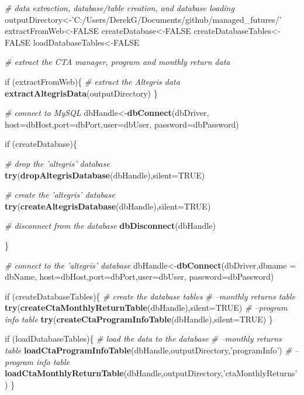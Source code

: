 \documentclass[]{article}
\newenvironment{Shaded}{\begin{snugshade}}{\end{snugshade}}
\newcommand{\KeywordTok}[1]{\textcolor[rgb]{0.13,0.29,0.53}{\textbf{{#1}}}}
\newcommand{\DataTypeTok}[1]{\textcolor[rgb]{0.13,0.29,0.53}{{#1}}}
\newcommand{\StringTok}[1]{\textcolor[rgb]{0.31,0.60,0.02}{{#1}}}
\newcommand{\CommentTok}[1]{\textcolor[rgb]{0.56,0.35,0.01}{\textit{{#1}}}}
\newcommand{\OtherTok}[1]{\textcolor[rgb]{0.56,0.35,0.01}{{#1}}}
\newcommand{\NormalTok}[1]{{#1}}
\begin{document}
\begin{Shaded}
\begin{Highlighting}[]
\CommentTok{# data extraction, database/table creation, and database loading}
\NormalTok{outputDirectory<-}\StringTok{'C:/Users/DerekG/Documents/github/managed_futures/'}
\NormalTok{extractFromWeb<-}\OtherTok{FALSE}
\NormalTok{createDatabase<-}\OtherTok{FALSE}
\NormalTok{createDatabaseTables<-}\OtherTok{FALSE}
\NormalTok{loadDatabaseTables<-}\OtherTok{FALSE}

\CommentTok{# extract the CTA manager, program and monthly return data}

\NormalTok{if (extractFromWeb)\{}
  \CommentTok{# extract the Altegris data}
  \KeywordTok{extractAltegrisData}\NormalTok{(outputDirectory)}
\NormalTok{\}}

\CommentTok{# connect to MySQL}
\NormalTok{dbHandle<-}\KeywordTok{dbConnect}\NormalTok{(dbDriver,}
                    \DataTypeTok{host=}\NormalTok{dbHost,}\DataTypeTok{port=}\NormalTok{dbPort,}\DataTypeTok{user=}\NormalTok{dbUser, }
                    \DataTypeTok{password=}\NormalTok{dbPassword)}

\NormalTok{if (createDatabase)\{}

  \CommentTok{# drop the 'altegris' database}
  \KeywordTok{try}\NormalTok{(}\KeywordTok{dropAltegrisDatabase}\NormalTok{(dbHandle),}\DataTypeTok{silent=}\OtherTok{TRUE}\NormalTok{)}

  \CommentTok{# create the 'altegris' database}
  \KeywordTok{try}\NormalTok{(}\KeywordTok{createAltegrisDatabase}\NormalTok{(dbHandle),}\DataTypeTok{silent=}\OtherTok{TRUE}\NormalTok{)}

  \CommentTok{# disconnect from the database}
  \KeywordTok{dbDisconnect}\NormalTok{(dbHandle)}

\NormalTok{\}  }

\CommentTok{# connect to the 'altegris' database}
\NormalTok{dbHandle<-}\KeywordTok{dbConnect}\NormalTok{(dbDriver,}\DataTypeTok{dbname =} \NormalTok{dbName,}
                    \DataTypeTok{host=}\NormalTok{dbHost,}\DataTypeTok{port=}\NormalTok{dbPort,}\DataTypeTok{user=}\NormalTok{dbUser, }
                    \DataTypeTok{password=}\NormalTok{dbPassword)}


\NormalTok{if (createDatabaseTables)\{}
  \CommentTok{# create the database tables}
  \CommentTok{# --monthly returns table}
  \KeywordTok{try}\NormalTok{(}\KeywordTok{createCtaMonthlyReturnTable}\NormalTok{(dbHandle),}\DataTypeTok{silent=}\OtherTok{TRUE}\NormalTok{)}
  \CommentTok{# --program info table}
  \KeywordTok{try}\NormalTok{(}\KeywordTok{createCtaProgramInfoTable}\NormalTok{(dbHandle),}\DataTypeTok{silent=}\OtherTok{TRUE}\NormalTok{)}
\NormalTok{\}}

\NormalTok{if (loadDatabaseTables)\{}
  \CommentTok{# load the data to the database}
  \CommentTok{# --monthly returns table}
  \KeywordTok{loadCtaProgramInfoTable}\NormalTok{(dbHandle,outputDirectory,}\StringTok{'programInfo'}\NormalTok{)}
  \CommentTok{# --program info table}
  \KeywordTok{loadCtaMonthlyReturnTable}\NormalTok{(dbHandle,outputDirectory,}\StringTok{'ctaMonthlyReturns'}\NormalTok{)}
\NormalTok{\}}
\end{Highlighting}
\end{Shaded}
\end{document}
